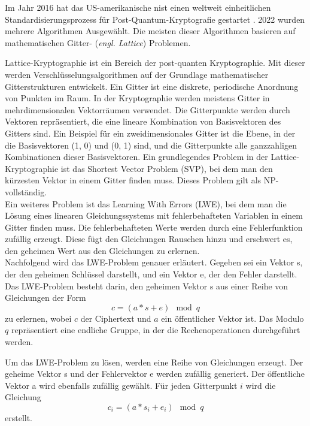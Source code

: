 Im Jahr 2016 hat das US-amerikanische \ac{nist} einen weltweit einheitlichen Standardisierungsprozess für Post-Quantum-Kryptografie gestartet \cite{moody_status_2022}.
2022 wurden mehrere Algorithmen Ausgewählt. Die meisten dieser Algorithmen basieren auf mathematischen Gitter- (\textit{engl. Lattice}) Problemen.

Lattice-Kryptographie \cite{micciancio_lattice-based_nodate} ist ein Bereich der post-quanten Kryptographie. 
Mit dieser werden Verschlüsselungsalgorithmen auf der Grundlage mathematischer Gitterstrukturen entwickelt. 
Ein Gitter ist eine diskrete, periodische Anordnung von Punkten im Raum. In der Kryptographie werden meistens Gitter in mehrdimensionalen Vektorräumen verwendet.
Die Gitterpunkte werden durch Vektoren repräsentiert, die eine lineare Kombination von Basisvektoren des Gitters sind. 
Ein Beispiel für ein zweidimensionales Gitter ist die Ebene, in der die Basisvektoren (1, 0) und (0, 1) sind, 
und die Gitterpunkte alle ganzzahligen Kombinationen dieser Basisvektoren.
Ein grundlegendes Problem in der Lattice-Kryptographie ist das Shortest Vector Problem (SVP), bei dem man den kürzesten Vektor in einem Gitter finden muss. 
Dieses Problem gilt als NP-vollständig. \cite[Abs. 2.1]{wang_lattice-based_2023}\\

Ein weiteres Problem ist das Learning With Errors (LWE), bei dem man die Lösung eines linearen Gleichungssystems mit fehlerbehafteten Variablen in einem Gitter finden muss.
Die fehlerbehafteten Werte werden durch eine Fehlerfunktion zufällig erzeugt. 
Diese fügt den Gleichungen Rauschen hinzu und erschwert es, den geheimen Wert aus den Gleichungen zu erlernen.\\

Nachfolgend wird das LWE-Problem genauer erläutert.
Gegeben sei ein Vektor s, der den geheimen Schlüssel darstellt, und ein Vektor e, der den Fehler darstellt. 
Das LWE-Problem besteht darin, den geheimen Vektor s aus einer Reihe von Gleichungen der Form 
$$c = (a * s + e)\mod{q}$$ zu erlernen, wobei $c$ der Ciphertext und $a$ ein öffentlicher Vektor ist. 
Das Modulo $q$ repräsentiert eine endliche Gruppe, in der die Rechenoperationen durchgeführt werden.

Um das LWE-Problem zu lösen, werden eine Reihe von Gleichungen erzeugt. Der geheime Vektor s und der Fehlervektor e werden zufällig generiert. 
Der öffentliche Vektor a wird ebenfalls zufällig gewählt. Für jeden Gitterpunkt $i$ wird die Gleichung 
$$c_i = (a * s_i + e_i) \mod{q}$$ 
erstellt.

